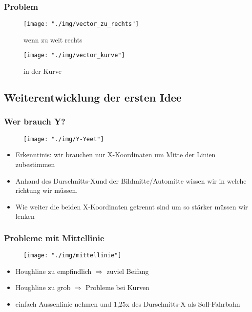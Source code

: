 \documentclass{beamer}
\begin{document}
	\begin{frame}
		\frametitle{Problem}
		\begin{center}
			\begin{figure}[h]
				\texttt{[image: "./img/vector\_zu\_rechts"]}
				\caption{wenn zu weit rechts}
				\label{fig:Lenkung via Vektoren zu weit rechts}
			\end{figure}
		\end{center}
		\begin{center}
				\begin{figure}[h]
					\texttt{[image: "./img/vector\_kurve"]}
					\caption{in der Kurve}
					\label{fig:Lenkung via Vektoren in Kurve}
				\end{figure}
			\end{center}
		
	\end{frame}

	\subsection{Weiterentwicklung der ersten Idee}

	\begin{frame}
		\frametitle{Wer brauch Y?}
		\begin{center}
			\begin{figure}[h]
				\texttt{[image: "./img/Y-Yeet"]}
				\label{fig:Weg mit dem Y}
			\end{figure}
		\end{center}

		\begin{itemize}
			\item Erkenntinis: wir brauchen nur X-Koordinaten um Mitte der Linien 		zubestimmen
			\item Anhand des \glqq Durschnitts-X\grqq  und der Bildmitte/Automitte wissen wir in welche richtung wir müssen. 
			\item Wie weiter die beiden X-Koordinaten getrennt sind um so stärker müssen wir lenken 
		\end{itemize}
	\end{frame}

	\begin{frame}
		\frametitle{Probleme mit Mittellinie}
		\begin{center}
			\begin{figure}[h]
				\texttt{[image: "./img/mittellinie"]}
				\label{fig:Mittellinie}
			\end{figure}
		\end{center}
		
		\begin{itemize}
			\item Houghline zu empfindlich $\Rightarrow$ zuviel \glqq Beifang\grqq 
			\item Houghline zu grob $\Rightarrow$ Probleme bei Kurven
			\item einfach Aussenlinie nehmen und 1,25x des Durschnitts-X als Soll-Fahrbahn
		\end{itemize}
	\end{frame}
\end{document}

